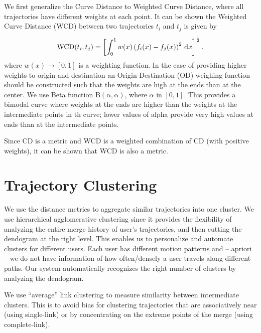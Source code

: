 We first generalize the Curve Distance to Weighted Curve Distance, where all trajectories have different weights at each point.  It can be shown the Weighted Curve Distance (WCD) between two trajectories $t_i$ and $t_j$ is given by
\begin{align}
\operatorname{WCD}(t_i,t_j) = \left[ \int_{0}^{1}{ w(x) \left( f_i(x) - f_j(x) \right )^2\, \mathrm{d}x }\right] ^ {\frac{1}{2}}.
\end{align}
\noindent where $w(x) \rightarrow [0,1]$ is a weighting function. In the case of providing higher weights to origin and destination an Origin-Destination (OD) weighing function should be constructed such that the weights are high at the ends than at the center. We use Beta function $\operatorname{B(\alpha,\alpha)}$, where $\alpha$ in $[0,1]$. This provides a bimodal curve where weights at the ends are higher than the weights at the intermediate points in th curve; lower values of alpha provide very high values at ends than at the intermediate points.

Since CD is a metric and WCD is a weighted combination of CD (with positive weights), it can be shown that WCD is also a metric.%

\section{Trajectory Clustering}
We use the distance metrics to aggregate similar trajectories into one cluster. We use hierarchical agglomerative clustering since it provides the flexibility of analyzing the entire merge history of user's trajectories, and then cutting the dendogram at the right level. This enables us to personalize and automate clusters for different users. Each user has different motion patterns and -- apriori -- we do not have information of how often/densely a user travels along different paths. Our system automatically recognizes the right number of clusters by analyzing the dendogram.

We use ``average'' link clustering to measure similarity between intermediate clusters. This is to avoid bias for clustering trajectories that are associatively near (using single-link) or by concentrating on the extreme points of the merge (using complete-link).%

